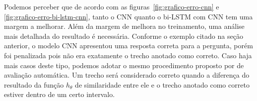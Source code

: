 Podemos perceber que de acordo com as figuras~\ref{fig:grafico-erro-cnn} e \ref{fig:grafico-erro-bi-lstm-cnn}, tanto o CNN quanto o bi-LSTM com CNN tem uma margem a melhorar. Além da margem de melhora no treinamento, uma análise mais detalhada do resultado é necessária. Conforme o exemplo citado na seção anterior, o modelo CNN apresentou uma resposta correta para a pergunta, porém foi penalizada pois não era exatamente o trecho anotado como correto. Caso haja mais casos deste tipo, podemos adotar o mesmo procedimento proposto por \cite{cambronero-deep-learning-code-search:2019} de avaliação automática. Um trecho será considerado correto quando a diferença do resultado da função $h_{\theta}$ de similaridade entre ele e o trecho anotado como correto estiver dentro de um certo intervalo.
